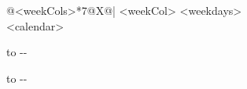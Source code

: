 \begin{tabularx}{\textwidth}{@{}<weekCols>*{7}{@{}X@{}|}}
<weekCol> <weekdays> \\ 
<calendar>
\end{tabularx}
\medskip

\parbox{\myLenTwoCol}{
    \vbox to \dimexpr\textheight-\pagetotal-\myHBL{}%
}
\hspace{\myLenTwoColSep}
\parbox{\myLenTwoCol}{
    \vbox to \dimexpr\textheight-\pagetotal-\myHBL{}%
}